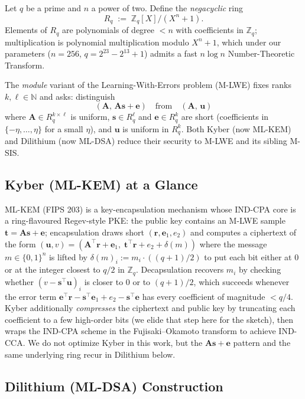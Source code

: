 \documentclass[11pt,a4paper]{article}
\newcommand{\Z}{\mathbb{Z}}
\newcommand{\N}{\mathbb{N}}
\newcommand{\Zq}{\Z_q}
\newcommand{\Rq}{R_q}
\begin{document}
Let $q$ be a prime and $n$ a power of two. Define the
\emph{negacyclic} ring
\[
  \Rq \;:=\; \Zq[X] / (X^n + 1).
\]
Elements of $\Rq$ are polynomials of degree $<n$ with coefficients in
$\Zq$; multiplication is polynomial multiplication modulo $X^n + 1$, which
under our parameters ($n=256$, $q = 2^{23} - 2^{13} + 1$) admits a fast
$n\log n$ Number-Theoretic Transform.

The \emph{module} variant of the Learning-With-Errors problem (M-LWE)
fixes ranks $k,\ell \in \N$ and asks: distinguish
\[
  (\mathbf{A},\,\mathbf{A}\mathbf{s} + \mathbf{e})
  \quad\text{from}\quad
  (\mathbf{A},\,\mathbf{u})
\]
where $\mathbf{A} \in \Rq^{k\times\ell}$ is uniform, $\mathbf{s} \in
\Rq^{\ell}$ and $\mathbf{e} \in \Rq^{k}$ are short (coefficients in
$\{-\eta,\dots,\eta\}$ for a small $\eta$), and $\mathbf{u}$ is uniform in
$\Rq^{k}$. Both Kyber (now ML-KEM) and Dilithium (now ML-DSA) reduce their
security to M-LWE and its sibling M-SIS.

\subsection{Kyber (ML-KEM) at a Glance}

ML-KEM (FIPS 203) is a key-encapsulation mechanism whose IND-CPA core is a
ring-flavoured Regev-style PKE: the public key contains an M-LWE sample
$\mathbf{t} = \mathbf{A}\mathbf{s} + \mathbf{e}$; encapsulation draws short
$(\mathbf{r}, \mathbf{e}_1, e_2)$ and computes a ciphertext of the form
$(\mathbf{u},v) = (\mathbf{A}^\top\mathbf{r} + \mathbf{e}_1,\;
\mathbf{t}^\top\mathbf{r} + e_2 + \delta(m))$
where the message $m \in \{0,1\}^n$ is lifted by $\delta(m)_i := m_i
\cdot ((q+1)/2)$ to put each bit either at $0$ or at the integer
closest to $q/2$ in $\Zq$. Decapsulation recovers $m_i$ by checking
whether $(v - \mathbf{s}^\top \mathbf{u})_i$ is closer to $0$ or to
$(q+1)/2$, which succeeds whenever the error term
$\mathbf{e}^\top\mathbf{r} - \mathbf{s}^\top\mathbf{e}_1 + e_2 - \mathbf{s}^\top \mathbf{e}$
has every coefficient of magnitude $< q/4$. Kyber additionally
\emph{compresses} the ciphertext and public key by truncating each
coefficient to a few high-order bits (we elide that step here for the
sketch), then wraps the IND-CPA scheme in the Fujisaki--Okamoto
transform to achieve IND-CCA. We do not optimize Kyber in this work,
but the $\mathbf{A}\mathbf{s} + \mathbf{e}$ pattern and the same
underlying ring recur in Dilithium below.

\subsection{Dilithium (ML-DSA) Construction}
\label{sec:dilithium}
\end{document}
